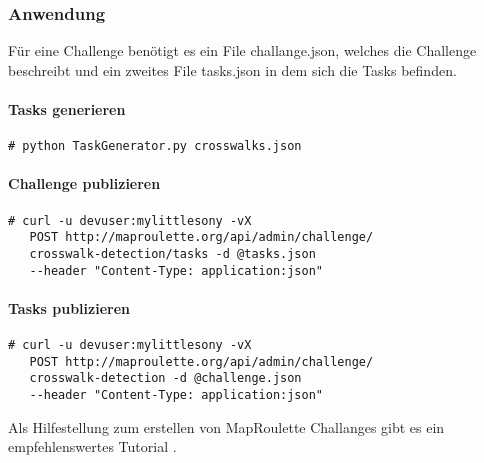 \subsubsection{Anwendung}
Für eine Challenge benötigt es ein File challange.json, welches die Challenge beschreibt und ein zweites File tasks.json in dem sich die Tasks befinden.\\

\paragraph{Tasks generieren}
\begin{lstlisting}[style=BashInputStyle]
 # python TaskGenerator.py crosswalks.json
\end{lstlisting}

\paragraph{Challenge publizieren}
\begin{lstlisting}[style=BashInputStyle]
 # curl -u devuser:mylittlesony -vX 
   POST http://maproulette.org/api/admin/challenge/
   crosswalk-detection/tasks -d @tasks.json 
   --header "Content-Type: application:json"
\end{lstlisting}

\paragraph{Tasks publizieren}
\begin{lstlisting}[style=BashInputStyle]
 # curl -u devuser:mylittlesony -vX 
   POST http://maproulette.org/api/admin/challenge/
   crosswalk-detection -d @challenge.json 
   --header "Content-Type: application:json"
\end{lstlisting}


Als Hilfestellung zum erstellen von MapRoulette Challanges gibt es ein empfehlenswertes Tutorial \cite{Tutorial}.